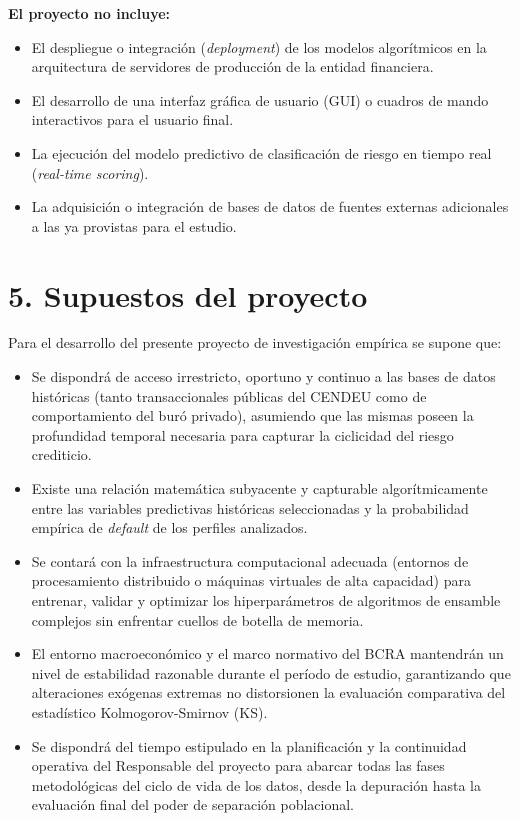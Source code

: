 \documentclass[
11pt, %
]{charter}
\begin{document}
\textbf{El proyecto no incluye:}
\begin{itemize}
\item El despliegue o integración (\textit{deployment}) de los modelos algorítmicos en la arquitectura de servidores de producción de la entidad financiera.
\item El desarrollo de una interfaz gráfica de usuario (GUI) o cuadros de mando interactivos para el usuario final.
\item La ejecución del modelo predictivo de clasificación de riesgo en tiempo real (\textit{real-time scoring}).
\item La adquisición o integración de bases de datos de fuentes externas adicionales a las ya provistas para el estudio.
\end{itemize}


\section{5. Supuestos del proyecto}
\label{sec:supuestos}

Para el desarrollo del presente proyecto de investigación empírica se supone que:
\begin{itemize}
\item Se dispondrá de acceso irrestricto, oportuno y continuo a las bases de datos históricas (tanto transaccionales públicas del CENDEU como de comportamiento del buró privado), asumiendo que las mismas poseen la profundidad temporal necesaria para capturar la ciclicidad del riesgo crediticio.
\item Existe una relación matemática subyacente y capturable algorítmicamente entre las variables predictivas históricas seleccionadas y la probabilidad empírica de \textit{default} de los perfiles analizados.
\item Se contará con la infraestructura computacional adecuada (entornos de procesamiento distribuido o máquinas virtuales de alta capacidad) para entrenar, validar y optimizar los hiperparámetros de algoritmos de ensamble complejos sin enfrentar cuellos de botella de memoria.
\item El entorno macroeconómico y el marco normativo del BCRA mantendrán un nivel de estabilidad razonable durante el período de estudio, garantizando que alteraciones exógenas extremas no distorsionen la evaluación comparativa del estadístico Kolmogorov-Smirnov (KS).
\item Se dispondrá del tiempo estipulado en la planificación y la continuidad operativa del Responsable del proyecto para abarcar todas las fases metodológicas del ciclo de vida de los datos, desde la depuración hasta la evaluación final del poder de separación poblacional.
\end{itemize}
\end{document}
